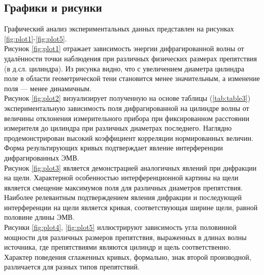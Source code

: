 \documentclass[10pt,a4paper,oneside, reqno]{amsproc}
\begin{document}
\newpage
\subsection{Графики и рисунки}
Графический анализ экспериментальных данных представлен на рисунках \ref{fig:plot1}-\ref{fig:plot5}.\\

Рисунок \ref{fig:plot1} отражает зависимость энергии 
дифрагированной волны от удалённости точки наблюдения при различных физических размерах препятствия (в д.сл. цилиндра).
Из рисунка видно, что с увеличением диаметра цилиндра поле в области геометрической тени становится менее значительным, а изменение поля ---
менее динамичным.\\

Рисунок \ref{fig:plot2} визуализирует полученную на основе таблицы (\ref{tab:table3}) экспериментальную зависимость поля дифрагированной на цилиндре волны
от величины отклонения измерительного прибора при фиксированном расстоянии измерителя до цилиндра при различных диаметрах последнего. Наглядно продемонстрирован высокий коэффициент корреляции нормированных величин. Форма результирующих кривых подтверждает явление интерференции дифрагированных ЭМВ.\\

Рисунок \ref{fig:plot3} является демонстрацией аналогичных явлений при дифракции на щели. Характерной особенностью интерференционной картины на щели является смещение максимумов поля для различных диаметров препятствия. Наиболее релевантным подтверждением явления дифракции и последующей интерференции на щели является кривая, соответствующая ширине щели, равной половине длины ЭМВ.\\

Рисунки \ref{fig:plot4}, \ref{fig:plot5} иллюстрируют зависимость угла половинной мощности для различных размеров препятствия, выраженных в длинах волны источника, где препятствиями являются цилиндр и щель соответственно. Характер поведения сглаженных кривых, формально, знак второй производной, различается для разных типов препятствий.\\
\end{document}
